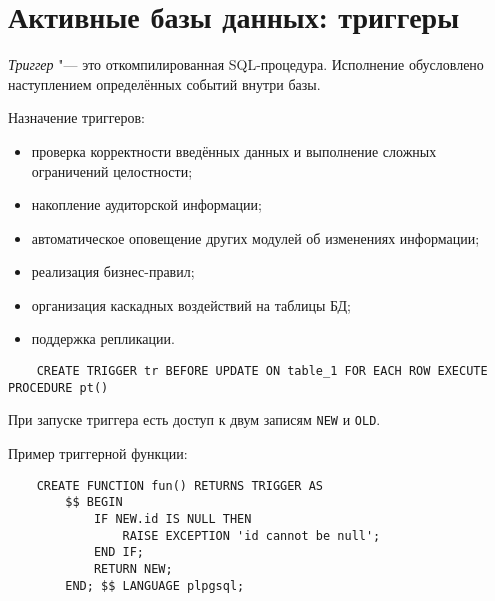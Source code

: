 \section{Активные базы данных: триггеры}

\begin{definition}
	\emph{Триггер} "--- это откомпилированная SQL-процедура.
	Исполнение обусловлено наступлением определённых событий внутри базы.
\end{definition}

Назначение триггеров:
\begin{itemize}
	\item проверка корректности введённых данных и выполнение сложных ограничений целостности;
	\item накопление аудиторской информации;
	\item автоматическое оповещение других модулей об изменениях информации;
	\item реализация бизнес-правил;
	\item организация каскадных воздействий на таблицы БД;
	\item поддержка репликации.
\end{itemize}

\begin{verbatim}
	CREATE TRIGGER tr BEFORE UPDATE ON table_1 FOR EACH ROW EXECUTE PROCEDURE pt()
\end{verbatim}

При запуске триггера есть доступ к двум записям \texttt{NEW} и \texttt{OLD}.

Пример триггерной функции:
\begin{verbatim}
	CREATE FUNCTION fun() RETURNS TRIGGER AS
		$$ BEGIN
			IF NEW.id IS NULL THEN
				RAISE EXCEPTION 'id cannot be null';
			END IF;
			RETURN NEW;
		END; $$ LANGUAGE plpgsql;
\end{verbatim}
